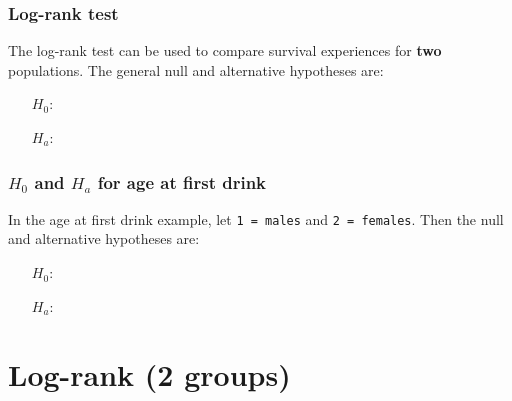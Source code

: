 \begin{frame}
\frametitle{Log-rank test}
The log-rank test can be used to compare survival experiences for \textbf{two} populations.  The general null and alternative hypotheses are:
\begin{itemize}
\item[]
\item[$H_0$:]
\item[]
\item[]
\item[]
\item[$H_a$:]
\item[]
\item[]
\item[]
\end{itemize}
\end{frame}

\begin{frame}
\frametitle{$H_0$ and $H_a$ for age at first drink}
In the age at first drink example, let \texttt{1 = males} and \texttt{2 = females}.  Then the null and alternative hypotheses are:
\begin{itemize}
\item[]
\item[$H_0$:]
\item[]
\item[]
\item[]
\item[$H_a$:]
\item[]
\item[]
\item[]
\end{itemize}
\end{frame}


\section[Log-rank (2 groups)]{Log-rank (2 groups)}
\subsection{}
\begin{frame}
\end{frame}

